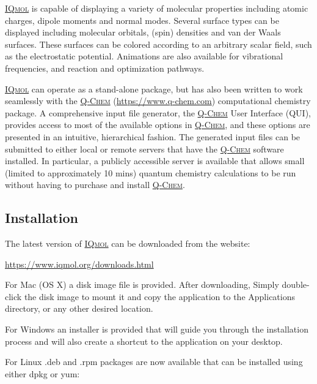 \documentclass[a4paper,12pt]{article}
\newcommand{\qchem}{\href{https://q-chem.com}{{\scshape Q-Chem}}}
\newcommand{\iqmol}{\href{https://www.iqmol.org}{{\scshape IQmol}}}
\begin{document}
\iqmol{} is capable of displaying a variety of molecular properties including
atomic charges, dipole moments and normal modes.  Several surface types can be
displayed including molecular orbitals, (spin) densities and van der Waals
surfaces. These surfaces can be colored according to an arbitrary scalar field,
such as the electrostatic potential.  Animations are also available for
vibrational frequencies, and reaction and optimization pathways.

\iqmol{} can operate as a stand-alone package, but has also been written to
work seamlessly with the \qchem{} (\url{https://www.q-chem.com}) computational
chemistry package.  A comprehensive input file generator, the \qchem{} User
Interface (QUI), provides access to most of the available options in \qchem{},
and these options are presented in an intuitive, hierarchical fashion.   The
generated input files can be submitted to either local or remote servers that
have the \qchem{} software installed.  In particular, a publicly accessible
server is available that allows small (limited to approximately 10 mins)
quantum chemistry calculations to be run without having to purchase and install
\qchem{}.



\subsection{Installation}

The latest version of \iqmol{} can be downloaded from the website:
\vspace{-1.0em}
\begin{center}
\url{https://www.iqmol.org/downloads.html}
\end{center}
\vspace{-1.0em}

For Mac (OS X) a disk image file is provided.  After downloading, Simply
double-click the disk image to mount it and copy the application to the
Applications directory, or any other desired location.

For Windows an installer is provided that will guide you through the
installation process and will also create a shortcut to the application on your
desktop.

For Linux .deb and .rpm packages are now available that can be installed using
either dpkg or yum:

\hspace*{2em}{\tt \#>  sudo dpkg -i iqmol\_x.x.x.deb}\\
\hspace*{2em}{\tt \#> sudo apt-get install -f }
\end{document}
